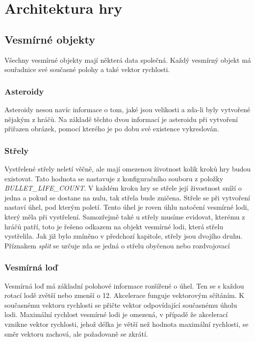 \chapter{Architektura hry}


\section{Vesmírné objekty}
Všechny vesmírné objekty mají některá data společná. Každý vesmírný objekt má souřadnice své současné polohy a také vektor rychlosti.

\subsection{Asteroidy}
Asteroidy nesou navíc informace o tom, jaké jsou velikosti a zda-li byly vytvořené nějakým z hráčů. 
Na základě těchto dvou informací je asteroidu při vytvoření přiřazen obrázek, pomocí kterého je po dobu své existence vykreslován.

\subsection{Střely}
Vystřelené střely neletí věčně, ale mají omezenou životnost kolik kroků hry budou existovat.
Tato hodnota se nastavuje z konfiguračního souboru z položky \emph{\uppercase{bullet\_life\_count}}.
V každém kroku hry se střele její živostnost sníží o jedna a pokud se dostane na nulu, tak střela bude zničena.
Střele se při vytvoření nastaví úhel, pod kterým poletí. Tento úhel je roven úhlu natočení vesmírné lodi, který měla při vystřelení.
Samozřejmě také u střely musíme evidovat, kterému z hráčů patří, toto je řešeno odkazem na objekt vesmírné lodi, která střelu vystřelila.
Jak již bylo zmíněno v předchozí kapitole, střely jsou dvojího druhu. Příznakem \emph{split} se určuje zda se jedná o střelu obyčenou nebo rozdvojovací


\subsection{Vesmírná loď}
Vesmírná loď má základní polohové informace rozšířené o úhel. Ten se s každou rotací lodě zvětší nebo zmenší o 12\textdegree.
Akcelerace funguje vektorovým sčítáním. K současnému vektoru rychlosti se přičte vektor odpovídající současnému úholu lodi.
Maximální rychlost vesmírné lodi je omezená, v případě že akcelerací vznikne vektor rychlosti, jehož délka je větší než hodnota maximální rychlosti, se směr vektoru zachová, ale požadovaně se zkrátí.

